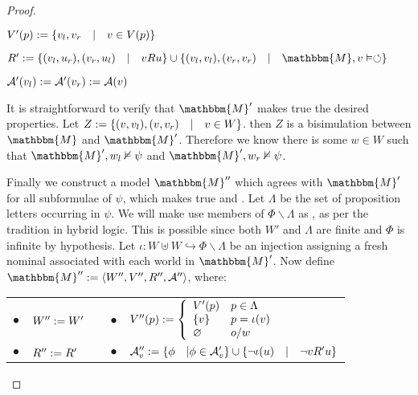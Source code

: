 \begin{proof}
\begin{itemizedot}
    \item $V' (p) := \{v_l, v_r \hspace{1em} | \hspace{1em} v \in V
    (p)\}$
    
    \item $R' \assign \{(v_l, u_r), (v_r, u_l) \hspace{1em} | \hspace{1em} v R
    u\} \cup \{(v_l, v_l), (v_r, v_r) \hspace{1em} | \hspace{1em} \mathbbm{M},
    v \vDash \circlearrowleft\}$
    
    \item $\mathcal{A}' (v_l) := \mathcal{A}' (v_r) := \mathcal{A}
    (v)$
  \end{itemizedot}
  
  
  It is straightforward to verify that $\mathbbm{M}'$ makes true the desired
  properties.  Let $Z := \{(v, v_l), (v, v_r) \hspace{1em} |
  \hspace{1em} v \in W\}$.  then $Z$ is a bisimulation between $\mathbbm{M}$
  and $\mathbbm{M}'$.  Therefore we know there is some $w \in W$ such that
  $\mathbbm{M}', w_l \nvDash \psi$ and $\mathbbm{M}', w_r \nvDash \psi$.
  
  
  
  Finally we construct a model $\mathbbm{M}''$ which agrees with
  $\mathbbm{M}'$ for all subformulae of $\psi$, which makes true
   and .  Let $\Lambda$ be the set of proposition
  letters occurring in $\psi$.  We will make use members of $\Phi \backslash
  \Lambda$ as {}, as per the tradition in hybrid logic.  This
  is possible since both $W'$ and $\Lambda$ are finite and $\Phi$ is infinite
  by hypothesis.  Let $\iota : W \uplus W \hookrightarrow \Phi \backslash
  \Lambda$ be an injection assigning a fresh nominal associated with each
  world in $\mathbbm{M}'$.  Now define $\mathbbm{M}'' \assign \langle W'',
  V'', R'', \mathcal{A}'' \rangle$, where:
  
  
  
  \begin{center}
    \begin{tabular}{lllll}
      $\bullet$ & $W'' := W'$ &  & $\bullet$ & $V'' (p) := \left\{
      \begin{array}{ll}
        V' (p) & p \in \Lambda\\
        \{v\} & p = \iota (v)\\
        \varnothing & o / w
      \end{array} \right.$\\
      $\bullet$ & $R'' := R'$ & {\hspace{3em}} & $\bullet$ &
      $\mathcal{A}''_v := \{\phi \hspace{1em} | \phi \in \mathcal{A}'_v
      \} \cup \{\neg \iota (u) \hspace{1em} | \hspace{1em} \neg v R' u\}$
    \end{tabular}
  \end{center}
  

\end{proof}
